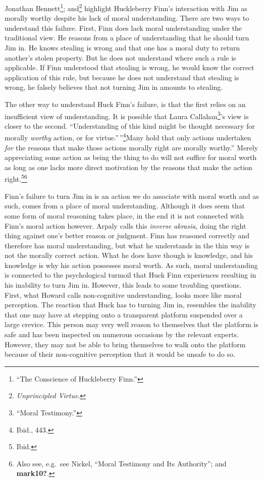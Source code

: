 \documentclass[phdthesis,12pt,final]{wuthesis}
\theoremstyle{definition}
\theoremstyle{definition}
\theoremstyle{definition}
\theoremstyle{definition}
\theoremstyle{remark}
\begin{document}
Jonathan Bennett\footnote{{``The {Conscience} of {Huckleberry Finn}.''}}; and\footnote{\emph{Unprincipled {Virtue}}.} highlight Huckleberry Finn's interaction with Jim as morally worthy despite his lack of moral understanding. There are two ways to understand this failure. First, Finn does lack moral understanding under the traditional view. He reasons from a place of understanding that he should turn Jim in. He knows stealing is wrong and that one has a moral duty to return another's stolen property. But he does not understand where such a rule is applicable. If Finn understood that stealing is wrong, he would know the correct application of this rule, but because he does not understand that stealing is wrong, he falsely believes that not turning Jim in amounts to stealing.

The other way to understand Huck Finn's failure, is that the first relies on an insufficient view of understanding. It is possible that Laura Callahan\footnote{{``Moral {Testimony}.''}}'s view is closer to the second. ``Understanding of this kind might be thought necessary for morally \emph{worthy} action, or for virtue.''\,''\footnote{Ibid., 443.}Many hold that only actions undertaken \emph{for} the reasons that make those actions morally right are morally worthy.'' Merely appreciating some action as being the thing to do will not suffice for moral worth as long as one lacks more direct motivation by the reasons that make the action right.\footnote{Ibid.}\footnote{Also see, e.g.~see Nickel, {``Moral {Testimony} and Its {Authority}''}; and \textbf{mark10?}.}

Finn's failure to turn Jim in is an action we do associate with moral worth and as such, comes from a place of moral understanding. Although it does seem that some form of moral reasoning takes place, in the end it is not connected with Finn's moral action however. Arpaly calls this \emph{inverse akrasia}, doing the right thing against one's better reason or judgment. Finn has reasoned correctly and therefore has moral understanding, but what he understands in the thin way is not the morally correct action. What he does have though is knowledge, and his knowledge is why his action possesses moral worth. As such, moral understanding is connected to the psychological turmoil that Huck Finn experiences resulting in his inability to turn Jim in. However, this leads to some troubling questions. First, what Howard calls non-cognitive understanding, looks more like moral perception. The reaction that Huck has to turning Jim in, resembles the inability that one may have at stepping onto a transparent platform suspended over a large crevice. This person may very well reason to themselves that the platform is safe and has been inspected on numerous occasions by the relevant experts. However, they may not be able to bring themselves to walk onto the platform because of their non-cognitive perception that it would be unsafe to do so.
\end{document}
